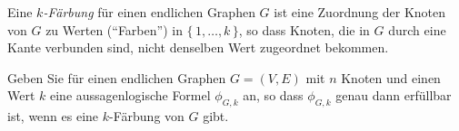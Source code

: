 \begin{exercise}
  \label{logic:modelling-the-graph-coloring-problem}
  Eine \emph{$k$-Färbung} für einen endlichen Graphen $G$ ist eine
  Zuordnung der Knoten von $G$ zu Werten (\enquote{Farben}) in $\{\,1, \dots,
  k\,\}$, so dass Knoten, die in $G$ durch eine Kante verbunden sind, nicht
  denselben Wert zugeordnet bekommen.

  Geben Sie für einen endlichen Graphen $G = (V,E)$ mit $n$ Knoten und einen
  Wert $k$ eine aussagenlogische Formel $\phi_{G,k}$ an, so dass $\phi_{G,k}$
  genau dann erfüllbar ist, wenn es eine $k$-Färbung von $G$ gibt.
\end{exercise}

